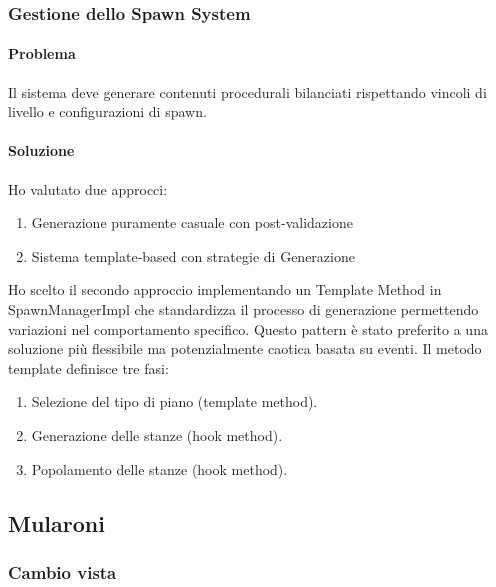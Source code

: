 \documentclass[a4paper,12pt]{report}
\begin{document}
\subsubsection{Gestione dello Spawn System}

\paragraph{Problema} Il sistema deve generare contenuti procedurali bilanciati rispettando vincoli di livello e configurazioni di spawn.

\paragraph{Soluzione} Ho valutato due approcci:
\begin{enumerate}
	\item Generazione puramente casuale con post-validazione
	\item Sistema template-based con strategie di Generazione
\end{enumerate}

Ho scelto il secondo approccio implementando un Template Method in SpawnManagerImpl che standardizza il processo di generazione permettendo variazioni nel comportamento specifico. Questo pattern è stato preferito a una soluzione più flessibile ma potenzialmente caotica basata su eventi.
Il metodo template definisce tre fasi:
\begin{enumerate}
	\item Selezione del tipo di piano (template method).
	\item Generazione delle stanze (hook method).
	\item Popolamento delle stanze (hook method).
\end{enumerate}

\subsection{Mularoni}

\subsubsection{Cambio vista}
\end{document}
